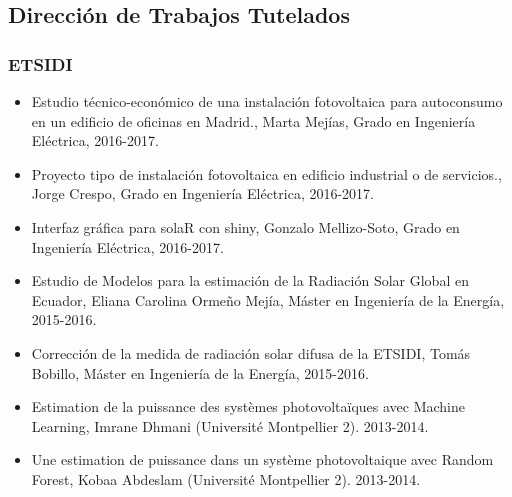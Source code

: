 \documentclass[article, a4paper]{memoir}
\begin{document}
\subsection{Dirección de Trabajos Tutelados}
\label{sec:org0d5c76a}
\subsubsection{ETSIDI}
\label{sec:org506ac38}
\begin{itemize}
\item \guillemotleft{}Estudio técnico-económico de una instalación fotovoltaica para autoconsumo en un edificio de oficinas en Madrid.\guillemotright{}, Marta Mejías, Grado en Ingeniería Eléctrica, 2016-2017.
\item \guillemotleft{}Proyecto tipo de instalación fotovoltaica en edificio industrial o de servicios.\guillemotright{}, Jorge Crespo, Grado en Ingeniería Eléctrica, 2016-2017.
\item \guillemotleft{}Interfaz gráfica para solaR con shiny\guillemotright{}, Gonzalo Mellizo-Soto, Grado en Ingeniería Eléctrica, 2016-2017.
\item \guillemotleft{}Estudio de Modelos para la estimación de la Radiación Solar Global en Ecuador\guillemotright{}, Eliana Carolina Ormeño Mejía, Máster en Ingeniería de la Energía, 2015-2016.
\item \guillemotleft{}Corrección de la medida de radiación solar difusa de la ETSIDI\guillemotright{}, Tomás Bobillo, Máster en Ingeniería de la Energía, 2015-2016.
\item \guillemotleft{}Estimation de la puissance des systèmes photovoltaïques avec Machine Learning\guillemotright{}, Imrane Dhmani (Université Montpellier 2). 2013-2014.
\item \guillemotleft{}Une estimation de puissance dans un système photovoltaique avec Random Forest\guillemotright{}, Kobaa Abdeslam (Université Montpellier 2). 2013-2014.
\end{itemize}
\end{document}
